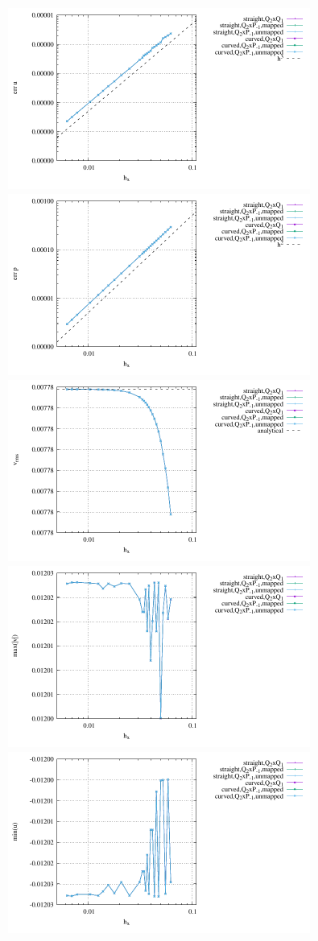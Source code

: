 \begin{center}
\includegraphics[width=8cm]{python_codes/fieldstone_25/results/doneahuerta/errv.pdf}
\includegraphics[width=8cm]{python_codes/fieldstone_25/results/doneahuerta/errp.pdf}\\
\includegraphics[width=8cm]{python_codes/fieldstone_25/results/doneahuerta/vrms.pdf}
\includegraphics[width=8cm]{python_codes/fieldstone_25/results/doneahuerta/max_vel.pdf}\\
\includegraphics[width=8cm]{python_codes/fieldstone_25/results/doneahuerta/min_u.pdf}

\end{center}
